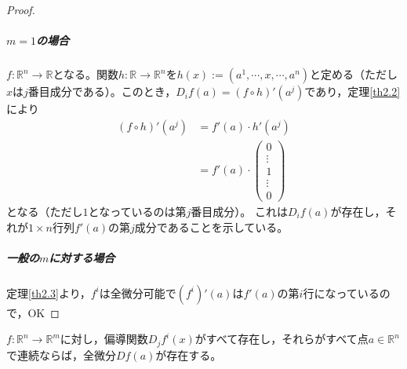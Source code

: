 \begin{proof}
	\subparagraph{$m=1$の場合}
	$f:\mathbb{R}^n\to\mathbb{R}$となる。関数$h:\mathbb{R}\to\mathbb{R}^n$を$h(x):=(a^1,\cdots,x,\cdots,a^n)$と定める（ただし$x$は$j$番目成分である）。このとき，$D_if(a)=(f\circ h)'(a^j)$であり，定理\ref{th2.2}により
	\[
	\begin{split}
	(f\circ h)'(a^j)&=f'(a)\cdot h'(a^j)\\
	&=f'(a)\cdot\begin{pmatrix} 0 \\ \vdots \\ 1 \\ \vdots \\ 0\end{pmatrix}
	\end{split}
	\]
	となる（ただし$1$となっているのは第$j$番目成分）。
	これは$D_if(a)$が存在し，それが$1\times n$行列$f'(a)$の第$j$成分であることを示している。\footnotemark
	\subparagraph{一般の$m$に対する場合}
	定理\ref{th2.3}より，$f^i$は全微分可能で$(f^i)'(a)$\footnotemark は$f'(a)$の第$i$行になっているので，OK
\end{proof}

\begin{framed}
	\begin{thm}\label{th2.8}
		$f:\mathbb{R}^n\to\mathbb{R}^m$に対し，偏導関数$D_jf^i(x)$がすべて存在し，それらがすべて点$a\in\mathbb{R}^n$で連続ならば，全微分$Df(a)$が存在する。
	\end{thm}
\end{framed}


